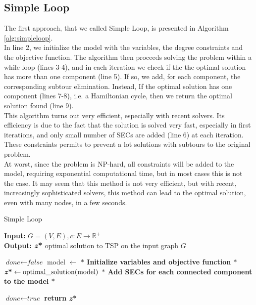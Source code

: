 \subsection{Simple Loop}
The first approach, that we called Simple Loop, is presented in Algorithm \ref{alg:simpleloop}.
\\ In line 2, we initialize the model with the variables, the degree constraints and the objective function. 
The algorithm then proceeds solving the problem within a while loop (lines 3-4), and in each iteration we check if the the optimal solution has more than one component (line 5). If so, we add, for each component, the corresponding subtour elimination. Instead, If the optimal solution has one component (lines 7-8), i.e. a Hamiltonian cycle, then we return the optimal solution found (line 9).
\\ This algorithm turns out very efficient, especially with recent solvers. Its efficiency is due to the fact that the solution is solved very fast, especially in first iterations, and only small number of SECs are added (line 6) at each iteration. These constraints permits to prevent a lot solutions with subtours to the original problem. 
\\ At worst, since the problem is NP-hard, all constraints will be added to the model, requiring exponential computational time, but in most cases this is not the case.
It may seem that this method is not very efficient, but with recent, increasingly sophisticated solvers, this method can lead to the optimal solution, even with many nodes, in a few seconds.
\begin{algorithm}
    \caption{Simple Loop}\label{Loop Method}
    \hspace*{\algorithmicindent} \textbf{Input:} $G = (V,E) , c : E \rightarrow \mathbb{R}^+$\\
    \hspace*{\algorithmicindent} \textbf{Output:} $\textbf{\textit{z}\text{*}} $ optimal solution to TSP on the input graph $G$
    \begin{algorithmic}[1]
    \State $\textit{done} \gets \textit{false}$
    \State model $ \leftarrow $ \textbf{$\ast$ Initialize variables and objective function $\ast$ }
    	\State $\textbf{\textit{z}\text{*}} \gets \text{optimal\_solution}(\text{model})$\;
	\State \textbf{ $\ast$ Add SECs for each connected component to the model $\ast$ }
	
	\Else \State $\textit{done} \gets \textit{true}$
	\EndIf	
    \EndWhile
    \State \textbf{return} $\textbf{\textit{z}\text{*}} $
    \end{algorithmic}
    \label{alg:simpleloop}
    \end{algorithm}
\noindent
